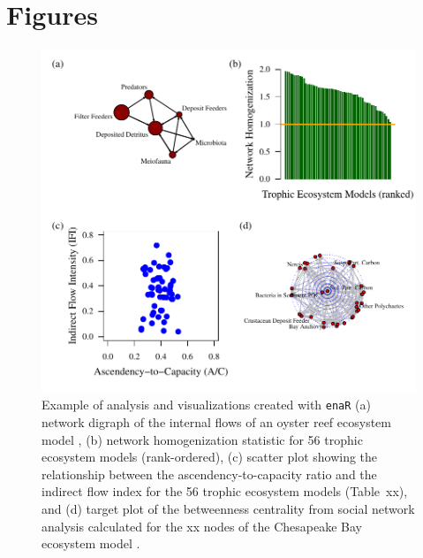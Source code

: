 \documentclass[11pt]{article}
\newcommand{\enaR}{\texttt{enaR}}
\begin{document}
\clearpage
\newpage

\section{Figures}

\begin{figure}[h]
\includegraphics[scale=1]{../figures/enaR_plot_example.pdf}
\caption{Example of analysis and visualizations created with \enaR\:
  (a) network digraph of the internal flows of an oyster reef
  ecosystem model \citep{dame81}, (b) network homogenization statistic
  for 56 trophic ecosystem models (rank-ordered), (c) scatter plot
  showing the relationship between the ascendency-to-capacity ratio
  and the indirect flow index for the 56 trophic ecosystem models
  (Table~xx), and (d) target plot of the betweenness centrality from
  social network analysis calculated for the xx nodes of the
  Chesapeake Bay ecosystem model \citep{baird89}. } \label{fig:example}
\end{figure}
\end{document}

